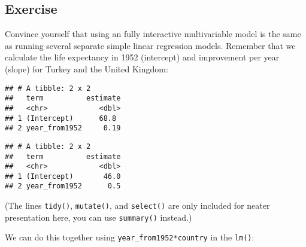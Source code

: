 \documentclass[]{book}
\makeatletter
\newenvironment{Shaded}{\begin{snugshade}}{\end{snugshade}}
\newcommand{\KeywordTok}[1]{\textcolor[rgb]{0.13,0.29,0.53}{\textbf{#1}}}
\newcommand{\DataTypeTok}[1]{\textcolor[rgb]{0.13,0.29,0.53}{#1}}
\newcommand{\DecValTok}[1]{\textcolor[rgb]{0.00,0.00,0.81}{#1}}
\newcommand{\StringTok}[1]{\textcolor[rgb]{0.31,0.60,0.02}{#1}}
\newcommand{\OperatorTok}[1]{\textcolor[rgb]{0.81,0.36,0.00}{\textbf{#1}}}
\newcommand{\NormalTok}[1]{#1}
\newenvironment{kframe}{%
\medskip{}
\setlength{\fboxsep}{.8em}
 \def\at@end@of@kframe{}%
 \ifinner\ifhmode%
  \def\at@end@of@kframe{\end{minipage}}%
  \begin{minipage}{\columnwidth}%
 \fi\fi%
 \def\FrameCommand##1{\hskip\@totalleftmargin \hskip-\fboxsep
 \colorbox{shadecolor}{##1}\hskip-\fboxsep
     \hskip-\linewidth \hskip-\@totalleftmargin \hskip\columnwidth}%
 \MakeFramed {\advance\hsize-\width
   \@totalleftmargin\z@ \linewidth\hsize
   \@setminipage}}%
 {\par\unskip\endMakeFramed%
 \at@end@of@kframe}
\renewenvironment{Shaded}{\begin{kframe}}{\end{kframe}}
\theoremstyle{definition}
\theoremstyle{definition}
\theoremstyle{definition}
\theoremstyle{remark}
\makeatother
\begin{document}
\subsection{Exercise}\label{exercise-39}

Convince yourself that using an fully interactive multivariable model is
the same as running several separate simple linear regression models.
Remember that we calculate the life expectancy in 1952 (intercept) and
improvement per year (slope) for Turkey and the United Kingdom:

\begin{Shaded}
\end{Shaded}

\begin{verbatim}
## # A tibble: 2 x 2
##   term          estimate
##   <chr>            <dbl>
## 1 (Intercept)      68.8 
## 2 year_from1952     0.19
\end{verbatim}

\begin{Shaded}
\end{Shaded}

\begin{verbatim}
## # A tibble: 2 x 2
##   term          estimate
##   <chr>            <dbl>
## 1 (Intercept)       46.0
## 2 year_from1952      0.5
\end{verbatim}

(The lines \texttt{tidy()}, \texttt{mutate()}, and \texttt{select()} are
only included for neater presentation here, you can use
\texttt{summary()} instead.)

We can do this together using \texttt{year\_from1952*country} in the
\texttt{lm()}:
\end{document}
